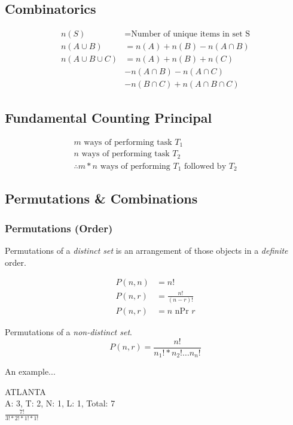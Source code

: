 \documentclass[twocolumn]{article}
\begin{document}
	\subsection*{Combinatorics}
	\begin{align*}
		n(S) &= \text{Number of unique items in set S} \\
		n(A \cup B) &= n(A) + n(B) - n(A \cap B) \\
		n(A \cup B \cup C) &=  n(A) + n(B) + n(C) \\
		& - n(A \cap B) - n(A \cap C) \\
		& - n(B \cap C) + n(A \cap B \cap C)
	\end{align*}
	
	\subsection*{Fundamental Counting Principal}
	
	\begin{align*}
		m \text{ ways of performing task } T_1 \\
		n \text{ ways of performing task } T_2 \\
		\therefore m * n \text{ ways of performing } T_1 \text{ followed by } T_2
	\end{align*}
	
	\subsection*{Permutations \& Combinations}
	
	\subsubsection*{Permutations (Order)}
	Permutations of a \emph{distinct set} is an arrangement of those objects in a \emph{definite} order.
	
	\begin{align*}
		P(n, n) &= n! \\
		P(n, r) &= \frac{n!}{(n - r)!} \\
		P(n, r) &= n \text{ nPr } r
	\end{align*}
	
	Permutations of a \emph{non-distinct set}.
	\begin{equation*}
		P(n, r) = \frac{n!}{ n_1! * n_2! \dots n_n! }
	\end{equation*}
	
	An example...
	\begin{center}
		ATLANTA \\
		A: 3, T: 2, N: 1, L: 1, Total: 7 \\
		$ \frac{7!}{3! * 2! * 1! * 1!} $
	\end{center}
	
\end{document}
